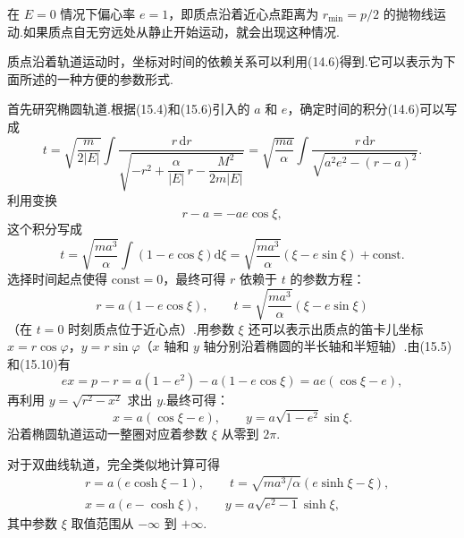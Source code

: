 在 $E=0$ 情况下偏心率 $e=1$，即质点沿着近心点距离为 $r_{\min}=p/2$ 的抛物线运动.如果质点自无穷远处从静止开始运动，就会出现这种情况.

质点沿着轨道运动时，坐标对时间的依赖关系可以利用(14.6)得到.它可以表示为下面所述的一种方便的参数形式.

首先研究椭圆轨道.根据(15.4)和(15.6)引入的 $a$ 和 $e$，确定时间的积分(14.6)可以写成
\begin{equation*}
  t=\sqrt{\frac{m}{2|E|}}\int
  \frac{r\,\mathrm{d}r}
  {\sqrt{-r^2+\dfrac{\alpha}{|E|}\,r
  -\dfrac{M^2}{2m|E|}}}
  =\sqrt{\frac{ma}{\alpha}}\int
  \frac{r\,\mathrm{d}r}
  {\sqrt{a^2e^2-(r-a)^2}}.
\end{equation*}
利用变换
\begin{equation*}
  r-a=-ae\cos\xi,
\end{equation*}
这个积分写成
\begin{equation*}
  t=\sqrt{\frac{ma^3}{\alpha}}
  \int\left(1-e\cos\xi\right)\mathrm{d}\xi
  =\sqrt{\frac{ma^3}{\alpha}}
  \left(\xi-e\sin\xi\right)+\mathrm{const}.
\end{equation*}
选择时间起点使得 $\mathrm{const}=0$，最终可得 $r$ 依赖于 $t$ 的参数方程：
\begin{equation}
  r=a\left(1-e\cos\xi\right),\qquad
  t=\sqrt{\frac{ma^3}{\alpha}}
  \left(\xi-e\sin\xi\right)
\end{equation}
（在 $t=0$ 时刻质点位于近心点）.用参数 $\xi$ 还可以表示出质点的笛卡儿坐标 $x=r\cos\varphi$，$y=r\sin\varphi$（$x$ 轴和 $y$ 轴分别沿着椭圆的半长轴和半短轴）.由(15.5)和(15.10)有
\begin{equation*}
  ex=p-r=a\left(1-e^2\right)
  -a\left(1-e\cos\xi\right)
  =ae\left(\cos\xi-e\right),
\end{equation*}
再利用 $y=\sqrt{r^2-x^2}$ 求出 $y$.最终可得：
\begin{equation}
  x=a\left(\cos\xi-e\right),\qquad
  y=a\sqrt{1-e^2}\sin\xi.
\end{equation}
沿着椭圆轨道运动一整圈对应着参数 $\xi$ 从零到 $2\pi$.

对于双曲线轨道，完全类似地计算可得
\begin{equation}
\begin{aligned}
  &r=a\left(e\cosh\xi-1\right),\qquad
  t=\sqrt{ma^3/\alpha}
  \left(e\sinh\xi-\xi\right),\\
  &x=a\left(e-\cosh\xi\right),\qquad
  y=a\sqrt{e^2-1}\sinh\xi,
\end{aligned}
\end{equation}
其中参数 $\xi$ 取值范围从 $-\infty$ 到 $+\infty$.

